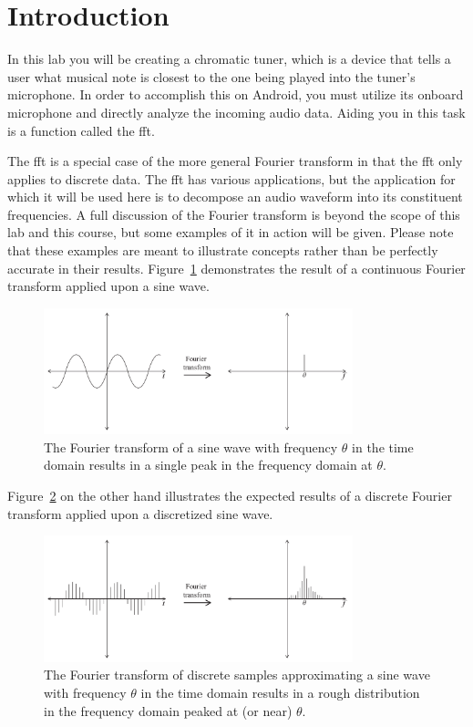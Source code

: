 \section{Introduction}

In this lab you will be creating a chromatic tuner, which is a device that tells a user what musical note is closest to the one being played into the tuner's microphone.
In order to accomplish this on Android, you must utilize its onboard microphone and directly analyze the incoming audio data.
Aiding you in this task is a function called the \ac{fft}.

The \ac{fft} is a special case of the more general Fourier transform in that the \ac{fft} only applies to discrete data.
The \ac{fft} has various applications, but the application for which it will be used here is to decompose an audio waveform into its constituent frequencies.
A full discussion of the Fourier transform is beyond the scope of this lab and this course, but some examples of it in action will be given.
Please note that these examples are meant to illustrate concepts rather than be perfectly accurate in their results.
Figure~\ref{fig:cft} demonstrates the result of a continuous Fourier transform applied upon a sine wave.
\begin{figure}[h]
\centering
\includegraphics[width=0.8\textwidth]{CFT.pdf}
\caption{The Fourier transform of a sine wave with frequency $\theta$ in the time domain results in a single peak in the frequency domain at $\theta$.}
\label{fig:cft}
\end{figure}
Figure~\ref{fig:dft} on the other hand illustrates the expected results of a discrete Fourier transform applied upon a discretized sine wave.
\begin{figure}[h]
\centering
\includegraphics[width=0.8\textwidth]{DFT.pdf}
\caption{The Fourier transform of discrete samples approximating a sine wave with frequency $\theta$ in the time domain results in a rough distribution in the frequency domain peaked at (or near) $\theta$.}
\label{fig:dft}
\end{figure}
